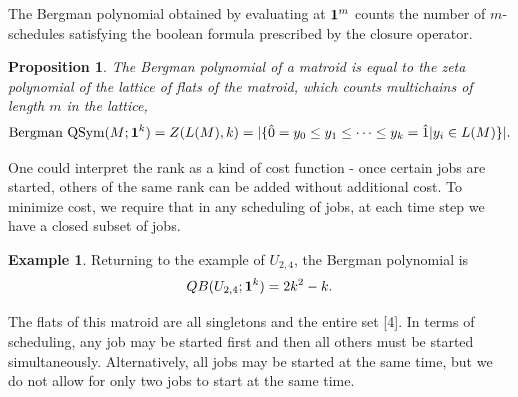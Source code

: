 \documentclass[12pt,reqno]{amsart}
\numberwithin{definition}{section}
\newtheorem{proposition}[definition]{Proposition}
\newtheorem{theorem}[definition]{Theorem}
\theoremstyle{definition}
\newtheorem{example}[definition]{Example}
\newcommand{\SSS}{\mathcal{S}}
\newcommand{\mset}[2]{ \left\{ #1 \; \middle| \; #2 \right\}}
\newcommand{\poly}{\chi} %
\begin{document}
The Bergman polynomial obtained
by evaluating at ${\bf 1}^m$ counts the number of
$m$-schedules satisfying the boolean formula prescribed by the closure
operator. 

\begin{proposition}
The Bergman polynomial of a matroid is equal to the zeta polynomial of the lattice of flats of the matroid, which counts multichains of length $m$ in the lattice,
$$\textrm{Bergman QSym}(M;{\bf 1}^k) = Z(L(M),k) = |\{ \hat{0} = y_0 \leq y_1 \leq \cdots \leq y_k = \hat{1} | y_i \in L(M) \}|.$$

\end{proposition}

 One could interpret the rank as a kind of cost function -
once certain jobs are started, others of the same rank can be added
without additional cost.  To minimize cost, we require that in any
scheduling of jobs, at each time step we have a closed subset of jobs.

\begin{example}
Returning to the example of $U_{2,4}$, the Bergman polynomial is
$$QB(U_{2,4};{\bf 1}^k) = 2k^2 - k.$$

The flats of this matroid are all singletons and the entire set [4].  In terms of scheduling, any job may be started first and then all others must be started simultaneously.  Alternatively, all jobs may be started at the same time, but we do not allow for only two jobs to start at the same time. 
\end{example}







\end{document}
